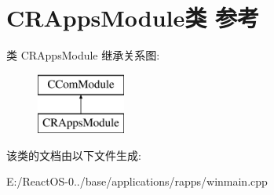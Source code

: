 \hypertarget{class_c_r_apps_module}{}\section{C\+R\+Apps\+Module类 参考}
\label{class_c_r_apps_module}
类 C\+R\+Apps\+Module 继承关系图\+:\begin{figure}[H]
\begin{center}
\leavevmode
\includegraphics[height=2.000000cm]{class_c_r_apps_module}
\end{center}
\end{figure}


该类的文档由以下文件生成\+:\begin{DoxyCompactItemize}
\item 
E\+:/\+React\+O\+S-\/0../base/applications/rapps/winmain.\+cpp\end{DoxyCompactItemize}
